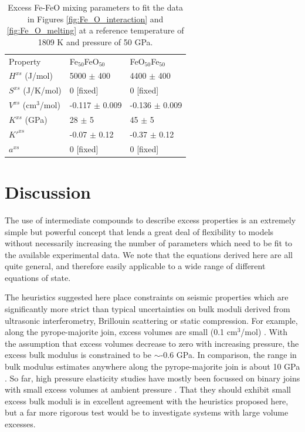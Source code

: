 \documentclass[review]{elsarticle}
\begin{document}
\begin{table}[ht!]
\centering
\caption{Excess Fe-FeO mixing parameters to fit the data in Figures \ref{fig:Fe_O_interaction} and \ref{fig:Fe_O_melting} at a reference temperature of 1809 K and pressure of 50 GPa.}
\label{tab:Fe_FeO}
\begin{tabular}{lll}
  Property        & Fe$_{50}$FeO$_{50}$  & FeO$_{50}$Fe$_{50}$ \\
  $H^{xs}$ (J/mol) &  5000 $\pm$ 400 & 4400 $\pm$ 400  \\
  $S^{xs}$ (J/K/mol)  & 0 [fixed] & 0 [fixed] \\
  $V^{xs}$ (cm$^3$/mol)   & -0.117 $\pm$ 0.009 &  -0.136 $\pm$ 0.009 \\
  $K^{xs}$  (GPa)  & 28 $\pm$ 5 & 45 $\pm$ 5  \\
  $K'^{xs}$   & -0.07 $\pm$ 0.12 & -0.37 $\pm$ 0.12  \\
  $a^{xs}$   & 0 [fixed] & 0 [fixed]  
\end{tabular}
\end{table}

\clearpage
\section{Discussion}

The use of intermediate compounds to describe excess properties is an extremely simple but powerful concept that lends a great deal of flexibility to models without necessarily increasing the number of parameters which need to be fit to the available experimental data. We note that the equations derived here are all quite general, and therefore easily applicable to a wide range of different equations of state.

The heuristics suggested here place constraints on seismic properties which are significantly more strict than typical uncertainties on bulk moduli derived from ultrasonic interferometry, Brillouin scattering or static compression. For example, along the pyrope-majorite join, excess volumes are small (0.1 cm$^3$/mol) \citep{HSSR1997}. With the assumption that excess volumes decrease to zero with increasing pressure, the excess bulk modulus is constrained to be $\sim$-0.6 GPa. In comparison, the range in bulk modulus estimates anywhere along the pyrope-majorite join is about 10 GPa \citep[see, for example][]{HDLWB2010}. So far, high pressure elasticity studies have mostly been focussed on binary joins with small excess volumes at ambient pressure \citep{FXMLX2015, HC2014}. That they should exhibit small excess bulk moduli is in excellent agreement with the heuristics proposed here, but a far more rigorous test would be to investigate systems with large volume excesses.
\end{document}
